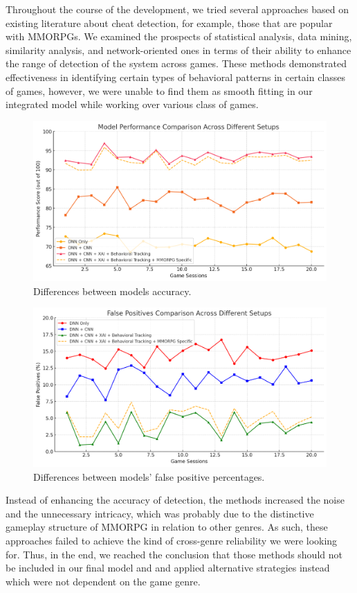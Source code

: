 Throughout the course of the development, we tried several approaches based on existing literature about cheat detection, for example, those that are popular with MMORPGs. We examined the prospects of statistical analysis, data mining, similarity analysis, and network-oriented ones in terms of their ability to enhance the range of detection of the system across games. These methods demonstrated effectiveness in identifying certain types of behavioral patterns in certain classes of games, however, we were unable to find them as smooth fitting in our integrated model while working over various class of games.

\begin{figure}[h]
\centering
\includegraphics[width=0.8\linewidth]{images/model.png}
\captionsetup{width=0.8\textwidth}
\caption{\label{fig:model}Differences between models accuracy.}
\end{figure}

\begin{figure}[h]
\centering
\includegraphics[width=0.8\linewidth]{images/false-positive.png}
\captionsetup{width=0.8\textwidth}
\caption{\label{fig:falsepositive}Differences between models' false positive percentages.}
\end{figure}

Instead of enhancing the accuracy of detection, the methods increased the noise and the unnecessary intricacy, which was probably due to the distinctive gameplay structure of MMORPG in relation to other genres. As such, these approaches failed to achieve the kind of cross-genre reliability we were looking for. Thus, in the end, we reached the conclusion that those methods should not be included in our final model and and applied alternative strategies instead which were not dependent on the game genre.

